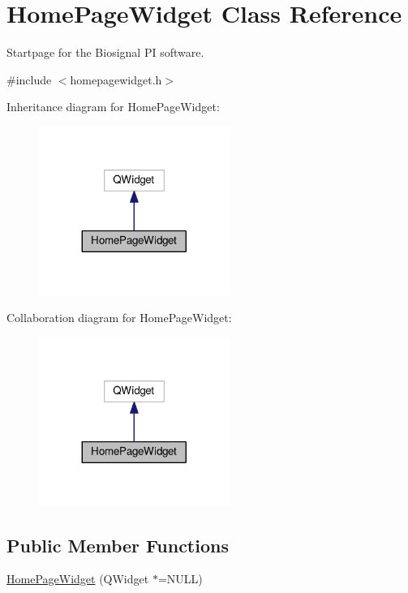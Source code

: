 \hypertarget{classHomePageWidget}{}\section{Home\+Page\+Widget Class Reference}
\label{classHomePageWidget}


Startpage for the Biosignal PI software.  




{\ttfamily \#include $<$homepagewidget.\+h$>$}



Inheritance diagram for Home\+Page\+Widget\+:\nopagebreak
\begin{figure}[H]
\begin{center}
\leavevmode
\includegraphics[width=176pt]{classHomePageWidget__inherit__graph}
\end{center}
\end{figure}


Collaboration diagram for Home\+Page\+Widget\+:\nopagebreak
\begin{figure}[H]
\begin{center}
\leavevmode
\includegraphics[width=176pt]{classHomePageWidget__coll__graph}
\end{center}
\end{figure}
\subsection*{Public Member Functions}
\begin{DoxyCompactItemize}
\item 
\hyperlink{classHomePageWidget_a72947da81d3ac3ce6edc9da05fd809ac}{Home\+Page\+Widget} (Q\+Widget $\ast$=N\+U\+LL)
\end{DoxyCompactItemize}



